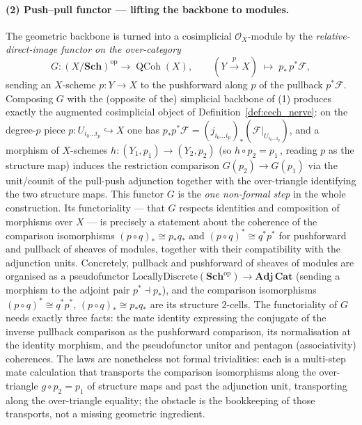 \paragraph{(2) Push--pull functor — lifting the backbone to modules.}
The geometric backbone is turned into a cosimplicial \(\mathcal{O}_X\)-module by
the \emph{relative-direct-image functor on the over-category}
\[
  G : (X/\mathbf{Sch})^{\mathrm{op}} \longrightarrow \operatorname{QCoh}(X),
  \qquad
  (Y \xrightarrow{\,p\,} X) \;\longmapsto\; p_*\, p^*\mathcal{F},
\]
sending an \(X\)-scheme \(p : Y \to X\) to the pushforward along \(p\) of the
pullback \(p^*\mathcal{F}\). Composing \(G\) with the (opposite of the) simplicial
backbone of (1) produces exactly the augmented cosimplicial object of
Definition~\ref{def:cech_nerve}: on the degree-\(p\) piece
\(p : U_{i_0 \ldots i_p} \hookrightarrow X\) one has
\(p_* p^*\mathcal{F} = (j_{i_0 \ldots i_p})_*(\mathcal{F}|_{U_{i_0 \ldots i_p}})\),
and a morphism of \(X\)-schemes \(h : (Y_1, p_1) \to (Y_2, p_2)\) (so
\(h \circ p_2 = p_1\)\,, reading \(p\) as the structure map) induces the
restriction comparison \(G(p_2) \to G(p_1)\) via the unit/counit of the
pull-push adjunction together with the over-triangle identifying the two
structure maps. This functor \(G\) is the \emph{one non-formal step} in the whole
construction. Its functoriality --- that \(G\) respects identities and composition
of morphisms over \(X\) --- is precisely a statement about the coherence of the
comparison isomorphisms \((p \circ q)_* \cong p_* q_*\) and
\((p \circ q)^* \cong q^* p^*\) for pushforward and pullback of sheaves of
modules, together with their compatibility with the adjunction units. Concretely,
pullback and pushforward of sheaves of modules are organised as a
pseudofunctor \(\mathrm{LocallyDiscrete}(\mathbf{Sch}^{\mathrm{op}}) \to
\mathbf{Adj}\,\mathbf{Cat}\) (sending a morphism to the adjoint pair
\(p^* \dashv p_*\)), and the comparison isomorphisms
\((p \circ q)^* \cong q^* p^*\), \((p \circ q)_* \cong p_* q_*\) are its structure
\(2\)-cells. The functoriality of \(G\) needs exactly three facts: the mate identity
expressing the conjugate of the inverse pullback comparison as the pushforward
comparison, its normalisation at the identity morphism, and the pseudofunctor
unitor and pentagon (associativity) coherences. The laws are nonetheless not formal
trivialities: each is a multi-step mate calculation that transports the comparison
isomorphisms along the over-triangle \(g \circ p_2 = p_1\) of structure maps and
past the adjunction unit, transporting along the over-triangle equality; the
obstacle is the bookkeeping of those transports, not a missing geometric ingredient.

